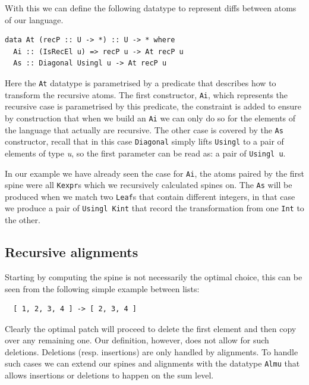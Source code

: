 \documentclass[11pt, titlepage]{article}
\begin{document}
With this we can define the following datatype to represent diffs between atoms of our language.
\begin{verbatim}
data At (recP :: U -> *) :: U -> * where
  Ai :: (IsRecEl u) => recP u -> At recP u
  As :: Diagonal Usingl u -> At recP u
\end{verbatim}

Here the \texttt{At} datatype is parametrised by a predicate that describes how 
to transform the recursive atoms. 
The first constructor, \texttt{Ai}, which represents the recursive case is 
parametrised by this predicate, the constraint is added to ensure by construction 
that when we build an \texttt{Ai} we can only do so for the elements of the 
language that actually are recursive.
The other case is covered by the \texttt{As} constructor, recall that in this case \texttt{Diagonal} simply lifts 
\texttt{Usingl} to a pair of elements of type \emph{u}, so the first parameter 
can be read as: a pair of \texttt{Usingl u}.

In our example we have already seen the case for \texttt{Ai}, the atoms paired 
by the first spine were all \texttt{Kexpr}s which we recursively calculated spines on. 
The \texttt{As} will be produced when we match two \texttt{Leaf}s that contain 
different integers, in that case we produce a pair of \texttt{Usingl Kint} that record 
the transformation from one \texttt{Int} to the other.

\subsection{Recursive alignments}\label{recursive alignments}

Starting by computing the spine is not necessarily the optimal choice, this can 
be seen from the following simple example between lists:

\begin{verbatim}
  [ 1, 2, 3, 4 ] -> [ 2, 3, 4 ]
\end{verbatim}
Clearly the optimal patch will proceed to delete the first element and then 
copy over any remaining one. Our definition, however, does not allow for such 
deletions. Deletions (resp. insertions) are only handled by alignments. To 
handle such cases we can extend our spines and alignments with the datatype 
\texttt{Almu} that allows insertions or deletions to happen on the sum level.
\end{document}
